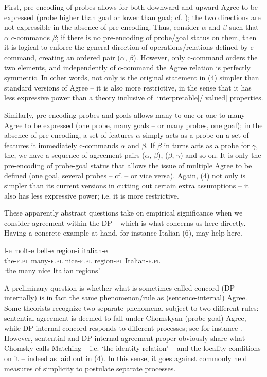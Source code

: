 \documentclass[output=paper]{langsci/langscibook}
\begin{document}
First, pre-encoding of probes allows for both downward and upward Agree to be expressed (probe higher than goal or lower than goal; cf. \citealt{Zeijlstra2012}); the two directions are not expressible in the absence of pre-encoding. Thus, consider $\alpha $ and $\beta $ such that $\alpha $ c-commands $\beta $; if there is no pre-encoding of probe/goal status on them, then it is logical to enforce the general direction of operations/relations defined by c-command, creating an ordered pair ($\alpha $, $\beta $). However, only c-command orders the two elements, and independently of c-command the Agree relation is perfectly symmetric. In other words, not only is the original statement in (4) simpler than standard versions of Agree – it is also more restrictive, in the sense that it has less expressive power than a theory inclusive of [interpretable]/[valued] properties.

Similarly, pre-encoding probes and goals allows many-to-one or one-to-many Agree to be expressed (one probe, many goals – or many probes, one goal); in the absence of pre-encoding, a set of features $\alpha $ simply acts as a probe on a set of features it immediately c-commands $\alpha $ and $\beta $. If $\beta $ in turns acts as a probe for $\gamma $, the, we have a sequence of agreement pairs ($\alpha $, $\beta $), ($\beta $, $\gamma $) and so on. It is only the pre-encoding of probe-goal status that allows the issue of multiple Agree to be defined (one goal, several probes – cf. \citealt{Carstens2001} – or vice versa). Again, (4) not only is simpler than its current versions in cutting out certain extra assumptions – it also has less expressive power; i.e. it is more restrictive.

These apparently abstract questions take on empirical significance when we consider agreement within the DP – which is what concerns us here directly. Having a concrete example at hand, for instance Italian (6), may help here. 

\ea%
    \label{ex:manzini:6}
    \gll l-e    molt-e   bell-e    region-i  italian-e\\
         the-\textsc{f.pl}   many-\textsc{f.pl}   nice-\textsc{f.pl}   region-\textsc{pl}    Italian-\textsc{f.pl} \\
    \glt ‘the many nice Italian regions’
\z

A preliminary question is whether what is sometimes called concord (DP-internally) is in fact the same phenomenon/rule as (sentence-internal) Agree. Some theorists recognize two separate phenomena, subject to two different rules: sentential agreement is deemed to fall under Chomskyan (probe-goal) Agree, while DP-internal concord responds to different processes; see for instance \citet{Giusti2008}. However, sentential and DP-internal agreement proper obviously share what Chomsky calls Matching – i.e. ‘the identity relation’ – and the locality conditions on it – indeed as laid out in (4). In this sense, it goes against commonly held measures of simplicity to postulate separate processes. 
\end{document}

